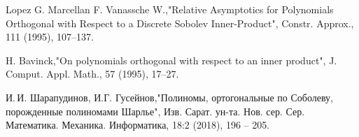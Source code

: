 \begin{thebibliography}{20}
Lopez G. Marcellan F. Vanassche W.,"Relative Asymptotics for Polynomials Orthogonal with Respect to a Discrete Sobolev Inner-Product", Constr. Approx., 111 (1995), 107–137.



H. Bavinck,"On polynomials orthogonal with respect to an inner product", J. Comput. Appl. Math., 57 (1995), 17--27.



И.\,И. Шарапудинов, И.Г. Гусейнов,"Полиномы, ортогональные по Соболеву, порожденные полиномами Шарлье", Изв. Сарат. ун-та. Нов. сер. Сер. Математика. Механика. Информатика, 18:2 (2018), 196 -- 205.


\end{thebibliography}